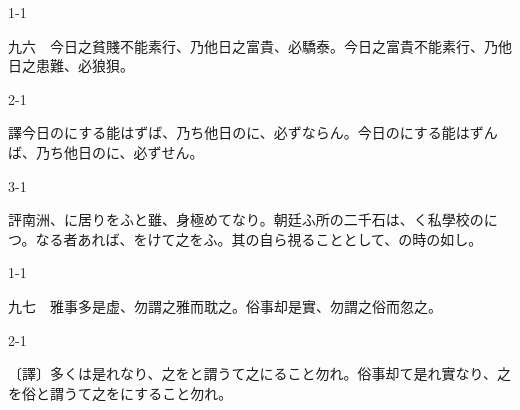 \documentclass[tate,paper=b6j,jafontsize=9pt]{jlreq}
\begin{document}
\begin{azconvIndented}{1\zw}{-1\zw}

九六　今日之貧賤不能素行、乃他日之富貴、必驕泰。今日之富貴不能素行、乃他日之患難、必狼狽。

\end{azconvIndented}
\begin{azconvIndented}{2\zw}{-1\zw}

譯今日のにする能はずば、乃ち他日のに、必ずならん。今日のにする能はずんば、乃ち他日のに、必ずせん。

\end{azconvIndented}
\begin{azconvIndented}{3\zw}{-1\zw}

評南洲、に居りをふと雖、身極めてなり。朝廷ふ所の二千石は、く私學校のにつ。なる者あれば、をけて之をふ。其の自ら視ることとして、の時の如し。

\end{azconvIndented}

\begin{azconvIndented}{1\zw}{-1\zw}

九七　雅事多是虚、勿謂之雅而耽\azconvKunten{\azconvJR}之。俗事却是實、勿謂之俗而忽\azconvKunten{\azconvJR}之。

\end{azconvIndented}
\begin{azconvIndented}{2\zw}{-1\zw}

〔譯〕多くは是れなり、之をと謂うて之にること勿れ。俗事却て是れ實なり、之を俗と謂うて之をにすること勿れ。

\end{azconvIndented}
\end{document}
